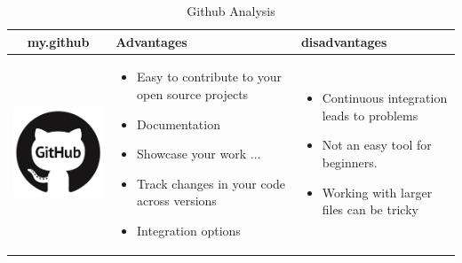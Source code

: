 \documentclass{article}
\begin{document}
	
	\begin{table}[h!]
		\centering
\begin{tabular}{ | c | m{5cm} | m{5cm} |}
		\hline
    my.github & Advantages & disadvantages \\ \hline
			\begin{minipage}{.4\textwidth}
\includegraphics[width=\linewidth, height=40mm]{github}
			\end{minipage}
		&
		\begin{itemize}
			\item Easy to contribute to your open source projects
			\item Documentation
			\item Showcase your work $\ldots$
			\item Track changes in your code across versions
			\item Integration options
		\end{itemize}
	&
	\begin{itemize}
\item Continuous integration leads to problems
\item Not an easy tool for beginners.
\item Working with larger files can be tricky 
		\end{itemize}
\\ \hline
		\end{tabular}
	\caption{Github Analysis}\label{tbl:mygithub}
	\end{table}
\end{document}
